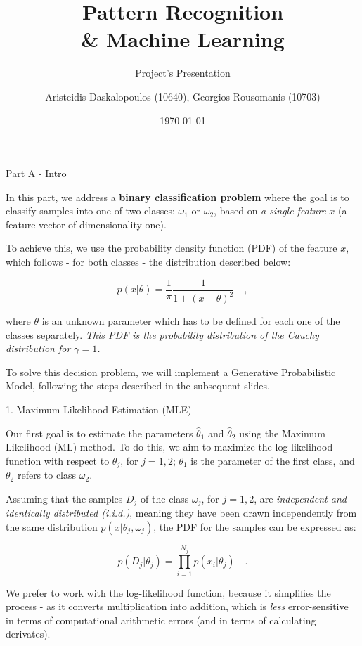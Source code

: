 \documentclass[aspectratio=169,xcolor=dvipsnames]{beamer}
\title{Pattern Recognition \\ \& Machine Learning}
\subtitle{Project's Presentation}
\author{Aristeidis Daskalopoulos (10640), Georgios Rousomanis (10703)}
\institute
{
    Aristotle University of Thessaloniki\\
    Department of Electrical and Computer Engineering
}
\date{\today} %
\begin{document}
\begin{frame}
    \titlepage
\end{frame}



\begin{frame}{Part A - Intro}

    In this part, we address a \textbf{binary classification problem} where the goal is to classify samples into one of two classes: $\omega_1$ or $\omega_2$, based on \textit{a single feature} $x$ (a feature vector of dimensionality one).

    \vspace{5pt}
    
    To achieve this, we use the probability density function (PDF) of the feature $x$, which follows - for both classes - the distribution described below:
    
    $$ p(x|\theta) = \frac{1}{\pi}\frac{1}{1 + (x - \theta)^2} \quad, $$
    
    where $\theta$ is an unknown parameter which has to be defined for each one of the classes separately. \textit{This PDF is the probability distribution of the Cauchy distribution for $\gamma = 1$.} 

    \vspace{5pt}

    \begin{center}
        To solve this decision problem, we will implement a Generative Probabilistic Model, following the steps described in the subsequent slides.
    \end{center}
    
\end{frame}


\begin{frame}{1. Maximum Likelihood Estimation (MLE)}

    Our first goal is to estimate the parameters $\hat{\theta}_1$ and $\hat{\theta}_2$ using the Maximum Likelihood (ML) method. To do this, we aim to maximize the log-likelihood function with respect to $\theta_j$, for $j = 1, 2$; $\theta_1$ is the parameter of the first class, and $\theta_2$ refers to class $\omega_2$.

    \vspace{5pt}
    
    Assuming that the samples $D_j$ of the class $\omega_j$, for $j = 1, 2$, are \textit{independent and identically distributed (i.i.d.)}, meaning they have been drawn independently from the same distribution $p(x | \theta_j, \omega_j)$, the PDF for the samples can be expressed as:

    $$ p(D_j | \theta_j) = \prod_{i=1}^{N_j} p(x_i | \theta_j)\quad.$$ 

    We prefer to work with the log-likelihood function, because it simplifies the process - as it converts multiplication into addition, which is \textit{less} error-sensitive in terms of computational arithmetic errors (and in terms of calculating derivates).
    
\end{frame}
\end{document}
